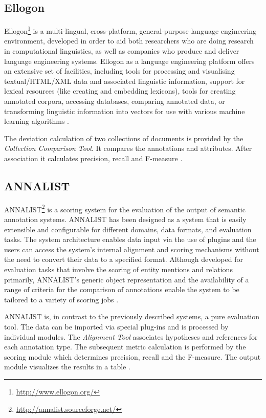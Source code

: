 \subsection{Ellogon}
Ellogon\footnote{\url{http://www.ellogon.org/}} is a multi-lingual, cross-platform, general-purpose language engineering environment, developed in order to aid both researchers who are doing research in computational linguistics, as well as companies who produce and deliver language engineering systems. Ellogon as a language engineering platform offers an extensive set of facilities, including tools for processing and visualising textual/HTML/XML data and associated linguistic information, support for lexical resources (like creating and embedding lexicons), tools for creating annotated corpora, accessing databases, comparing annotated data, or transforming linguistic information into vectors for use with various machine learning algorithms \cite{Ellogon}.

The deviation calculation of two collections of documents is provided by the \textit{Collection Comparison Tool}. It compares the annotations and attributes. After association it calculates precision, recall and F-measure \cite{Linsmayr:2010}.

\subsection{ANNALIST}
\gls{ANNALIST}\footnote{\url{http://annalist.sourceforge.net/}} is a scoring system for the evaluation of the output of semantic annotation systems. ANNALIST has been designed as a system that is easily extensible and configurable for different domains, data formats, and evaluation tasks. The system architecture enables data input via the use of plugins and the users can access the system’s internal alignment and scoring mechanisms without the need to convert their data to a specified format. Although developed for evaluation tasks that involve the scoring of entity mentions and relations primarily, ANNALIST's generic object representation and the availability of a range of criteria for the comparison of annotations enable the system to be tailored to a variety of scoring jobs \cite{Demetriou:2008}.

ANNALIST is, in contrast to the previously described systems, a pure evaluation tool. The data can be imported via special plug-ins and is processed by individual modules. The \textit{Alignment Tool} associates hypotheses and references for each annotation type. The subsequent metric calculation is performed by the scoring module which determines precision, recall and the F-measure. The output module visualizes the results in a table \cite{Linsmayr:2010}.

